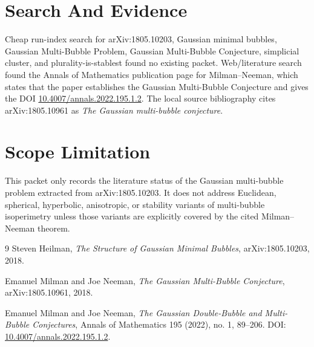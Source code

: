 \documentclass[11pt]{article}
\begin{document}
\section*{Search And Evidence}

Cheap run-index search for arXiv:1805.10203, Gaussian minimal bubbles,
Gaussian Multi-Bubble Problem, Gaussian Multi-Bubble Conjecture, simplicial
cluster, and plurality-is-stablest found no existing packet.  Web/literature
search found the Annals of Mathematics publication page for Milman--Neeman,
which states that the paper establishes the Gaussian Multi-Bubble Conjecture
and gives the DOI \href{https://doi.org/10.4007/annals.2022.195.1.2}
{10.4007/annals.2022.195.1.2}.  The local source bibliography cites
arXiv:1805.10961 as \emph{The Gaussian multi-bubble conjecture}.

\section*{Scope Limitation}

This packet only records the literature status of the Gaussian multi-bubble
problem extracted from arXiv:1805.10203.  It does not address Euclidean,
spherical, hyperbolic, anisotropic, or stability variants of multi-bubble
isoperimetry unless those variants are explicitly covered by the cited
Milman--Neeman theorem.

\begin{thebibliography}{9}
Steven Heilman,
\emph{The Structure of Gaussian Minimal Bubbles},
arXiv:1805.10203, 2018.

Emanuel Milman and Joe Neeman,
\emph{The Gaussian Multi-Bubble Conjecture},
arXiv:1805.10961, 2018.

Emanuel Milman and Joe Neeman,
\emph{The Gaussian Double-Bubble and Multi-Bubble Conjectures},
Annals of Mathematics 195 (2022), no. 1, 89--206.
DOI: \href{https://doi.org/10.4007/annals.2022.195.1.2}
{10.4007/annals.2022.195.1.2}.
\end{thebibliography}
\end{document}
